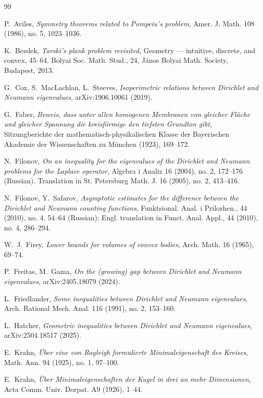 \documentclass[a4paper,12pt]{article}
\numberwithin{equation}{section}
\newcommand{\<}{\langle}
\renewcommand{\>}{\rangle}
\theoremstyle{plain}
\theoremstyle{definition}
\theoremstyle{remark}
\begin{document}
\begin{thebibliography}{99}

 P.~Aviles, 
{\it Symmetry theorems related to Pompeiu’s problem}, 
Amer. J. Math. 108 (1986), no. 5, 1023--1036.

 K.~Bezdek, 
{\it Tarski's plank problem revisited}, 
Geometry --- intuitive, discrete, and convex, 45--64.
Bolyai Soc. Math. Stud., 24,
János Bolyai Math. Society, Budapest, 2013.

G.~Cox, S.~MacLachlan, L.~Steeves, 
{\it Isoperimetric relations between Dirichlet and Neumann eigenvalues}, 
arXiv:1906.10061 (2019).

 G.~Faber, 
{\it Beweis, dass unter allen homogenen Membranen von gleicher Fläche 
und gleicher Spannung die kreisförmige den tiefsten Grundton gibt}, 
Sitzungberichte der mathematisch-physikalischen Klasse 
der Bayerischen Akademie der Wissenschaften zu München (1923), 169--172.

 N.~Filonov,
{\it On an inequality for the eigenvalues of the Dirichlet
and Neumann problems for the Laplace operator}, 
Algebra i Analiz 16 (2004), no. 2, 172--176 (Russian). 
Translation in St. Petersburg Math. J. 16 (2005), no. 2, 413--416.

 N.~Filonov, Y.~Safarov, 
{\it Asymptotic estimates for the difference between the Dirichlet and Neumann counting functions}, Funktsional. Anal. i Prilozhen., 44 (2010), no. 4, 54--64 (Russian); 
Engl. translation in Funct. Anal. Appl., 44 (2010), no. 4, 286--294.

 W.~J.~Firey, 
{\it Lower bounds for volumes of convex bodies}, 
Arch. Math. 16 (1965), 69--74.

 P.~Freitas, M.~Gama,
{\it On the (growing) gap between Dirichlet and Neumann eigenvalues},
arXiv:2405.18079 (2024).

 L.~Friedlander, 
{\it Some inequalities between Dirichlet and Neumann eigenvalues},
 Arch. Rational Mech. Anal. 116 (1991), no. 2, 153--160.
 
 L.~Hatcher,
{\it Geometric inequalities between Dirichlet and Neumann eigenvalues},
arXiv:2504.18517 (2025).

E.~Krahn,
{\it Über eine von Rayleigh formulierte Minimaleigenschaft des Kreises}, 
Math. Ann. 94 (1925), no. 1, 97--100. 

E.~Krahn,
{\it Über Minimaleigenschaften der Kugel in drei un mehr Dimensionen},
Acta Comm. Univ. Dorpat. A9 (1926), 1--44.


\end{thebibliography}
\end{document}
